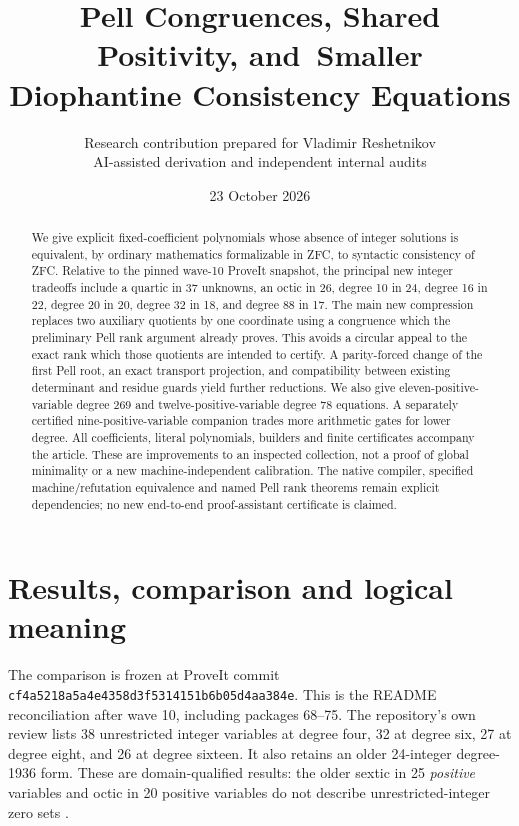 \documentclass[11pt]{article}
\title{Pell Congruences, Shared Positivity, and\ Smaller Diophantine Consistency Equations}
\author{Research contribution prepared for Vladimir Reshetnikov\\\small AI-assisted derivation and independent internal audits}
\date{23 October 2026}
\theoremstyle{remark}\newtheorem{remark}[theorem]{Remark}
\newcommand{\pin}{\texttt{cf4a5218a5a4e4358d3f5314151b6b05d4aa384e}}
\begin{document}
\maketitle
\begin{abstract}
We give explicit fixed-coefficient polynomials whose absence of integer
solutions is equivalent, by ordinary mathematics formalizable in ZFC, to
syntactic consistency of ZFC. Relative to the pinned wave-10 ProveIt
snapshot, the principal new integer tradeoffs include a quartic in 37
unknowns, an octic in 26, degree 10 in 24, degree 16 in 22, degree 20 in
20, degree 32 in 18, and degree 88 in 17. The main new compression replaces two auxiliary
quotients by one coordinate using a congruence which the preliminary Pell
rank argument already proves. This avoids a circular appeal to the exact
rank which those quotients are intended to certify. A parity-forced
change of the first Pell root, an exact transport projection, and compatibility between existing
determinant and residue guards yield further reductions. We also give
eleven-positive-variable degree 269 and twelve-positive-variable degree
78 equations. A separately certified nine-positive-variable companion
trades more arithmetic gates for lower degree. All coefficients, literal
polynomials, builders and finite certificates accompany the article.
These are improvements to an inspected collection, not a proof of global
minimality or a new machine-independent calibration. The native compiler,
specified machine/refutation equivalence and named Pell rank theorems
remain explicit dependencies; no new end-to-end proof-assistant
certificate is claimed.
\end{abstract}
\tableofcontents

\section{Results, comparison and logical meaning}
\label{sec:results}

The comparison is frozen at ProveIt commit \pin. This is the README
reconciliation after wave 10, including packages 68--75. The repository's
own review lists 38 unrestricted integer variables at degree four, 32 at
degree six, 27 at degree eight, and 26 at degree sixteen. It also retains
an older 24-integer degree-1936 form. These are domain-qualified results:
the older sextic in 25 \emph{positive} variables and octic in 20 positive
variables do not describe unrestricted-integer zero sets
\cite{repo,review}.
\end{document}
